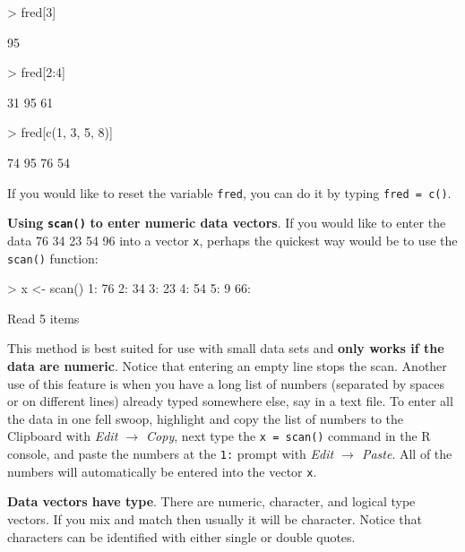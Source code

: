 \documentclass[english]{article}
\renewenvironment{Schunk}{\vspace{\topsep}}{\vspace{\topsep}}
\begin{document}
\begin{Schunk}
\begin{Sinput}
> fred[3]
\end{Sinput}
\begin{Soutput}
[1] 95
\end{Soutput}
\begin{Sinput}
> fred[2:4]
\end{Sinput}
\begin{Soutput}
[1] 31 95 61
\end{Soutput}
\begin{Sinput}
> fred[c(1, 3, 5, 8)]
\end{Sinput}
\begin{Soutput}
[1] 74 95 76 54
\end{Soutput}
\end{Schunk}


If you would like to reset the variable \texttt{fred}, you can do
it by typing \texttt{fred = c()}.

\textbf{Using} \texttt{\textbf{scan()}} \textbf{to enter numeric data
vectors}. If you would like to enter the data 76 34 23 54 96 into
a vector \texttt{x}, perhaps the quickest way would be to use the
\texttt{scan()} function:

\begin{Schunk}
\begin{Sinput}
> x <- scan()
1: 76
2: 34
3: 23
4: 54
5: 9
66: 
\end{Sinput}
\begin{Soutput}
Read 5 items
\end{Soutput}
\end{Schunk}

This method is best suited for use with small data sets and \textbf{only
works if the data are numeric}. Notice that entering an empty line
stops the scan. Another use of this feature is when you have a long
list of numbers (separated by spaces or on different lines) already
typed somewhere else, say in a text file. To enter all the data in
one fell swoop, highlight and copy the list of numbers to the Clipboard
with \emph{Edit $\rightarrow$ Copy}, next type the \texttt{x = scan()}
command in the \textsf{R} console, and paste the numbers at the \texttt{1:}
prompt with \emph{Edit $\rightarrow$ Paste}. All of the numbers will
automatically be entered into the vector \texttt{x}.

\textbf{Data vectors have type}. There are numeric, character, and
logical type vectors. If you mix and match then usually it will be
character. Notice that characters can be identified with either single
or double quotes.
\end{document}
